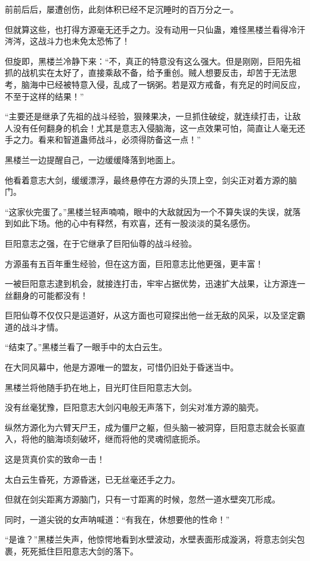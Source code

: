 \begin{this_body}
前前后后，屡遭创伤，此刻体积已经不足沉睡时的百万分之一。

但就算这些，也打得方源毫无还手之力。没有动用一只仙蛊，难怪黑楼兰看得冷汗涔涔，这战斗力也未免太恐怖了！

但旋即，黑楼兰冷静下来：“不，真正的特意没有这么强大。但是刚刚，巨阳先祖抓的战机实在太好了，直接乘敌不备，给予重创。贼人想要反击，却苦于无法思考，脑海中已经被特意入侵，乱成了一锅粥。若是双方戒备，有充足的时间反应，不至于这样的结果！”

“主要还是继承了先祖的战斗经验，狠辣果决，一旦抓住破绽，就连续打击，让敌人没有任何翻身的机会！尤其是意志入侵脑海，这一点效果可怕，简直让人毫无还手之力。看来和智道蛊师战斗，必须得防备这一点！”

黑楼兰一边提醒自己，一边缓缓降落到地面上。

他看着意志大剑，缓缓漂浮，最终悬停在方源的头顶上空，剑尖正对着方源的脑门。

“这家伙完蛋了。”黑楼兰轻声喃喃，眼中的大敌就因为一个不算失误的失误，就落到如此下场。他的心中有释然，有欢喜，还有一股淡淡的莫名感伤。

巨阳意志之强，在于它继承了巨阳仙尊的战斗经验。

方源虽有五百年重生经验，但在这方面，巨阳意志比他更强，更丰富！

一被巨阳意志逮到机会，就接连打击，牢牢占据优势，迅速扩大战果，让方源连一丝翻身的可能都没有！

巨阳仙尊不仅仅只是运道好，从这方面也可窥探出他一丝无敌的风采，以及坚定霸道的战斗才情。

“结束了。”黑楼兰看了一眼手中的太白云生。

在大同风幕中，他是方源唯一的盟友，可惜仍旧处于昏迷当中。

黑楼兰将他随手扔在地上，目光盯住巨阳意志大剑。

没有丝毫犹豫，巨阳意志大剑闪电般无声落下，剑尖对准方源的脑壳。

纵然方源化为六臂天尸王，成为僵尸之躯，但头脑一被洞穿，巨阳意志就会长驱直入，将他的脑海顷刻破坏，继而将他的灵魂彻底扼杀。

这是货真价实的致命一击！

太白云生昏死，方源昏迷，已无丝毫还手之力。

但就在剑尖距离方源脑门，只有一寸距离的时候，忽然一道水壁突兀形成。

同时，一道尖锐的女声呐喊道：“有我在，休想要他的性命！”

“是谁？”黑楼兰失声，他惊愕地看到水壁波动，水壁表面形成漩涡，将意志剑尖包裹，死死抵住巨阳意志大剑的落下。


\end{this_body}

